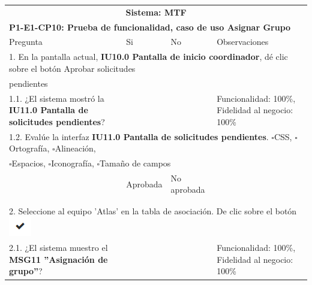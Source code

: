 \documentclass[oneside,10pt]{book}
\begin{document}
\begin{tabularx}{\textwidth}{ X l l X }
\multicolumn{4}{c}{\cellcolor[HTML]{9B9B9B}\textbf{Sistema: MTF}}                                                                                     \\
\multicolumn{4}{l}{\cellcolor[HTML]{EFEFEF}\textbf{P1-E1-CP10: Prueba de funcionalidad, caso de uso Asignar Grupo}}                                                   \\ \hline
\multicolumn{1}{|X|}{Pregunta}                               & \multicolumn{1}{l|}{Si} & \multicolumn{1}{l|}{No} & \multicolumn{1}{X|}{Observaciones} \\ \hline

\multicolumn{4}{|l|}{1. En la pantalla actual, \textbf{IU10.0 Pantalla de inicio coordinador}, dé clic sobre el botón Aprobar solicitudes} \\
\multicolumn{4}{|l|}{pendientes}  \\ \hline
\multicolumn{1}{|X|}{1.1. ¿El sistema mostró la \textbf{IU11.0 Pantalla de solicitudes pendientes}?} & \multicolumn{1}{l|}{}   & \multicolumn{1}{l|}{}   & \multicolumn{1}{X|}{Funcionalidad: 100\%, Fidelidad al negocio: 100\%}              \\ \hline

\multicolumn{4}{|l|}{1.2. Evalúe la interfaz \textbf{IU11.0 Pantalla de solicitudes pendientes}. $\square$CSS, $\square$Ortografía, $\square$Alineación,}                        \\
\multicolumn{4}{|l|}{$\square$Espacios, $\square$Iconografía, $\square$Tamaño de campos}                        \\ \hline
\multicolumn{1}{|l|}{ }	& \multicolumn{1}{l|}{Aprobada} & \multicolumn{1}{l|}{No aprobada} & \multicolumn{1}{l|}{ } \\ \hline
\multicolumn{1}{|l|}{ } & \multicolumn{1}{l|}{ } & \multicolumn{1}{l|}{ } & \multicolumn{1}{l|}{ } \\
\multicolumn{1}{|l|}{ } & \multicolumn{1}{l|}{ } & \multicolumn{1}{l|}{ } & \multicolumn{1}{l|}{ } \\ \hline

\multicolumn{4}{|l|}{2. Seleccione al equipo 'Atlas' en la tabla de asociación. De clic sobre el botón \includegraphics[scale=.6]{images/aprobar} }              \\ \hline
\multicolumn{1}{|X|}{2.1. ¿El sistema muestro el \textbf{MSG11 ''Asignación de grupo''}?} & \multicolumn{1}{l|}{}   & \multicolumn{1}{l|}{}   & \multicolumn{1}{X|}{Funcionalidad: 100\%, Fidelidad al negocio: 100\%}              \\ \hline


\end{tabularx}
\end{document}
